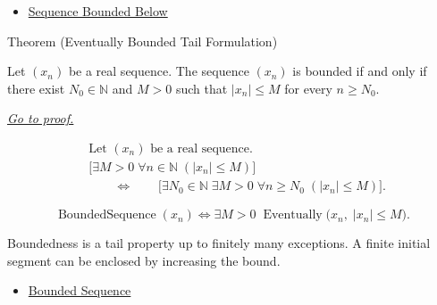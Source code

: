 \begin{dependencies}
\begin{itemize}
  \item \hyperref[def:sequence-bounded-below]{Sequence Bounded Below}
\end{itemize}
\end{dependencies}


\begin{theorembox}{Theorem (Eventually Bounded Tail Formulation)}
\begin{theorem}
\label{thm:eventually-bounded-tail-formulation}
Let $(x_n)$ be a real sequence. The sequence $(x_n)$ is bounded if and only
if there exist $N_0 \in \mathbb{N}$ and $M > 0$ such that $|x_n| \le M$ for
every $n \ge N_0$.

\smallskip
\noindent
\hyperref[prf:eventually-bounded-tail-formulation]{\textit{Go to proof.}}
\end{theorem}
\end{theorembox}

\begin{remark*}
\[
\begin{aligned}
&\text{Let } (x_n) \text{ be a real sequence.}\\
&\bigl[
\exists M > 0\;
\forall n \in \mathbb{N}\;(|x_n| \le M)
\bigr]\\
&\qquad\Longleftrightarrow\qquad
\bigl[
\exists N_0 \in \mathbb{N}\;
\exists M > 0\;
\forall n \ge N_0\;(|x_n| \le M)
\bigr].
\end{aligned}
\]
\end{remark*}

\begin{remark*}
\[
\operatorname{BoundedSequence}(x_n)
\Longleftrightarrow
\exists M > 0\;
\operatorname{Eventually}\bigl(x_n,\; |x_n| \le M\bigr).
\]
\end{remark*}

\begin{remark*}[Interpretation]
Boundedness is a tail property up to finitely many exceptions. A finite
initial segment can be enclosed by increasing the bound.
\end{remark*}

\begin{dependencies}
\begin{itemize}
  \item \hyperref[def:bounded-sequence]{Bounded Sequence}
\end{itemize}
\end{dependencies}

